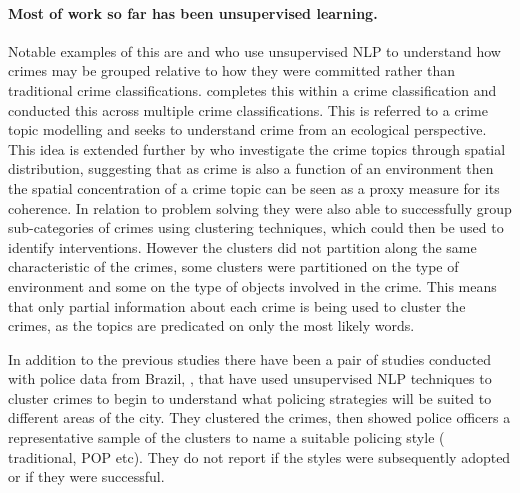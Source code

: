 \paragraph{Most of work so far has been unsupervised learning.} Notable examples of this are \textcite{birks2020unsupervised} and \textcite{kuang2017crime} who use unsupervised NLP to understand how crimes may be grouped relative to how they were committed rather than traditional crime classifications. \textcite{birks2020unsupervised} completes this within a crime classification and \textcite{kuang2017crime} conducted this across multiple crime classifications. This is referred to a crime topic modelling and seeks to understand crime from an ecological perspective. This idea is extended further by \textcite{Pandey201876} who investigate the crime topics through spatial distribution, suggesting that as crime is also a function of an environment then the spatial concentration of a crime topic can be seen as a proxy measure for its coherence. In relation to problem solving they were also able to successfully group sub-categories of crimes using clustering techniques, which could then be used to identify interventions. However the clusters did not partition along the same characteristic of the crimes, some clusters were partitioned on the type of environment and some on the type of objects involved in the crime. This means that only partial information about each crime is being used to cluster the crimes, as the topics are predicated on only the most likely words. 

In addition to the previous studies there have been a pair of studies conducted with police data from Brazil, \parencite{Basilio2020849, Basilio2019333}, that have used unsupervised NLP techniques to cluster crimes to begin to understand what policing strategies will be suited to different areas of the city. They clustered the crimes, then showed police officers a representative sample of the clusters to name a suitable policing style ( traditional, POP etc). They do not report if the styles were subsequently adopted or if they were successful.

